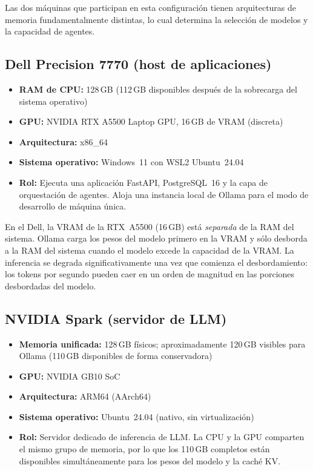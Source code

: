 Las dos máquinas que participan en esta configuración tienen arquitecturas
de memoria fundamentalmente distintas, lo cual determina la selección de
modelos y la capacidad de agentes.

\subsection{Dell Precision 7770 (host de aplicaciones)}

\begin{itemize}
  \item \textbf{RAM de CPU:} 128\,GB (112\,GB disponibles después de la sobrecarga del sistema operativo)
  \item \textbf{GPU:} NVIDIA RTX A5500 Laptop GPU, 16\,GB de VRAM (discreta)
  \item \textbf{Arquitectura:} x86\_64
  \item \textbf{Sistema operativo:} Windows~11 con WSL2 Ubuntu~24.04
  \item \textbf{Rol:} Ejecuta una aplicación FastAPI,
        PostgreSQL~16 y la capa de orquestación de agentes.
        Aloja una instancia local de Ollama para el
        modo de desarrollo de máquina única.
\end{itemize}

En el Dell, la VRAM de la RTX~A5500 (16\,GB) está \emph{separada} de la
RAM del sistema. Ollama carga los pesos del modelo primero en la VRAM y
sólo desborda a la RAM del sistema cuando el modelo excede la capacidad de
la VRAM. La inferencia se degrada significativamente una vez que comienza
el desbordamiento: los tokens por segundo pueden caer en un orden de
magnitud en las porciones desbordadas del modelo.

\subsection{NVIDIA Spark (servidor de LLM)}

\begin{itemize}
  \item \textbf{Memoria unificada:} 128\,GB físicos; aproximadamente 120\,GB
        visibles para Ollama (110\,GB disponibles de forma conservadora)
  \item \textbf{GPU:} NVIDIA GB10 SoC
  \item \textbf{Arquitectura:} ARM64 (AArch64)
  \item \textbf{Sistema operativo:} Ubuntu~24.04 (nativo, sin virtualización)
  \item \textbf{Rol:} Servidor dedicado de inferencia de LLM. La CPU y la
        GPU comparten el mismo grupo de memoria, por lo que los 110\,GB
        completos están disponibles simultáneamente para los pesos del
        modelo y la caché KV.
\end{itemize}

